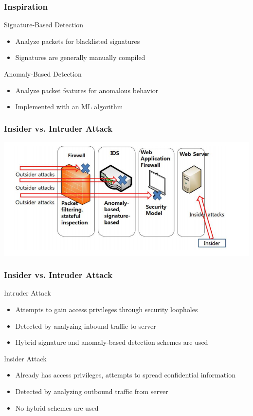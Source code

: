 \documentclass[10pt,mathserif]{beamer}
\begin{document}
\begin{frame}
  \frametitle{Inspiration}
  \begin{block}{Signature-Based Detection}
    \begin{itemize}
    \item Analyze packets for blacklisted signatures
    \item Signatures are generally manually compiled
    \end{itemize}
  \end{block}
  \begin{block}{Anomaly-Based Detection}
    \begin{itemize}
    \item Analyze packet features for anomalous behavior
    \item Implemented with an ML algorithm
    \end{itemize}
  \end{block}
\end{frame}

\begin{frame}
  \frametitle{Insider vs. Intruder Attack}
  \includegraphics[width=\textwidth,natwidth=725,natheight=336]{figures/insider_vs_outsider.png}
\end{frame}

\begin{frame}
  \frametitle{Insider vs. Intruder Attack}
  \begin{block}{Intruder Attack}
    \begin{itemize}
    \item Attempts to gain access privileges through security loopholes
    \item Detected by analyzing inbound traffic to server
    \item Hybrid signature and anomaly-based detection schemes are used
    \end{itemize}
  \end{block}
  \begin{block}{Insider Attack}
    \begin{itemize}
    \item Already has access privileges, attempts to spread confidential information
    \item Detected by analyzing outbound traffic from server
    \item No hybrid schemes are used
    \end{itemize}
  \end{block}
\end{frame}
\end{document}
